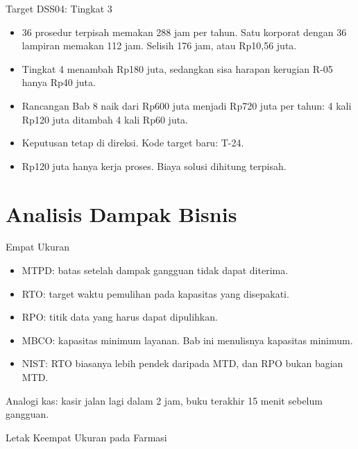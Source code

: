 \documentclass[aspectratio=169, table, 12pt]{beamer}
\begin{document}
\begin{frame}{{\Large Target DSS04: Tingkat 3}}
  \vspace{6pt}
  \small
  \begin{itemize}
    \item 36 prosedur terpisah memakan 288 jam per tahun. Satu korporat dengan 36 lampiran memakan
          112 jam. Selisih 176 jam, atau Rp10,56 juta.
    \item Tingkat 4 menambah Rp180 juta, sedangkan sisa harapan kerugian R-05 hanya Rp40 juta.
    \item Rancangan Bab 8 naik dari Rp600 juta menjadi Rp720 juta per tahun: 4 kali Rp120 juta
          ditambah 4 kali Rp60 juta.
    \item Keputusan tetap di direksi. Kode target baru: T-24.
    \item Rp120 juta hanya kerja proses. Biaya solusi dihitung terpisah.
  \end{itemize}
\end{frame}

\section{Analisis Dampak Bisnis}

\begin{frame}{{\Large Empat Ukuran}}
  \vspace{6pt}
  \small
  \begin{itemize}
    \item MTPD: batas setelah dampak gangguan tidak dapat diterima.
    \item RTO: target waktu pemulihan pada kapasitas yang disepakati.
    \item RPO: titik data yang harus dapat dipulihkan.
    \item MBCO: kapasitas minimum layanan. Bab ini menulisnya kapasitas minimum.
    \item NIST: RTO biasanya lebih pendek daripada MTD, dan RPO bukan bagian MTD.
  \end{itemize}
  \vspace{4pt}
  Analogi kas: kasir jalan lagi dalam 2 jam, buku terakhir 15 menit sebelum gangguan.
\end{frame}

\begin{frame}{{\Large Letak Keempat Ukuran pada Farmasi}}
  \vspace{4pt}
  \begin{center}
    \resizebox{!}{0.74\textheight}{}
  \end{center}
\end{frame}
\end{document}
